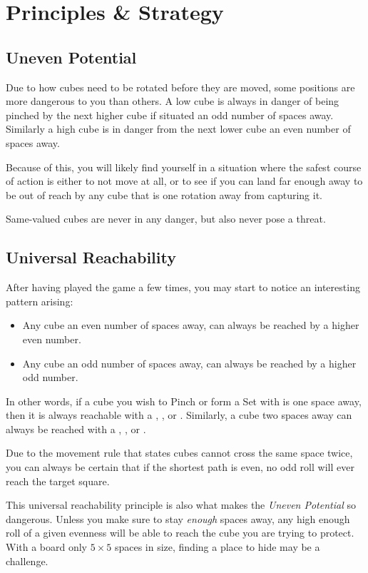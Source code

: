 \section{Principles \& Strategy}
\subsection{Uneven Potential}
Due to how cubes need to be rotated before they are moved, some positions are more dangerous to you than others. A low cube is always in danger of being pinched by the next higher cube if situated an odd number of spaces away. Similarly a high cube is in danger from the next lower cube an even number of spaces away.

Because of this, you will likely find yourself in a situation where the safest course of action is either to not move at all, or to see if you can land far enough away to be out of reach by any cube that is one rotation away from capturing it.

Same-valued cubes are never in any danger, but also never pose a threat.
\subsection{Universal Reachability}
After having played the game a few times, you may start to notice an interesting pattern arising:
\begin{itemize}
    \item Any cube an even number of spaces away, can always be reached by a higher even number.
    \item Any cube an odd number of spaces away, can always be reached by a higher odd number.
\end{itemize}
In other words, if a cube you wish to Pinch or form a Set with is one space away, then it is always reachable with a , , or .
Similarly, a cube two spaces away can always be reached with a , , or .

Due to the movement rule that states cubes cannot cross the same space twice, you can always be certain that if the shortest path is even, no odd roll will ever reach the target square.

This universal reachability principle is also what makes the \textit{Uneven Potential} so dangerous.
Unless you make sure to stay \textit{enough} spaces away, any high enough roll of a given evenness will be able to reach the cube you are trying to protect.
With a board only $5\times 5$ spaces in size, finding a place to hide may be a challenge.

